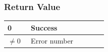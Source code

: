 \documentclass[twoside,11pt,fleqn]{book}
\begin{document}

\subsubsection*{Return Value}{\quad}
\begin{table}[!h]
\footnotesize
\begin{tabular}{|p{0.20\linewidth}|p{0.66\linewidth}|} \hline
0&Success\\ \hline
$\ne 0$&Error number\\ \hline
\end{tabular}
\vspace{-0em}
\end{table}
\FloatBarrier

% 

%
\subsubsection{}
\end{document}
